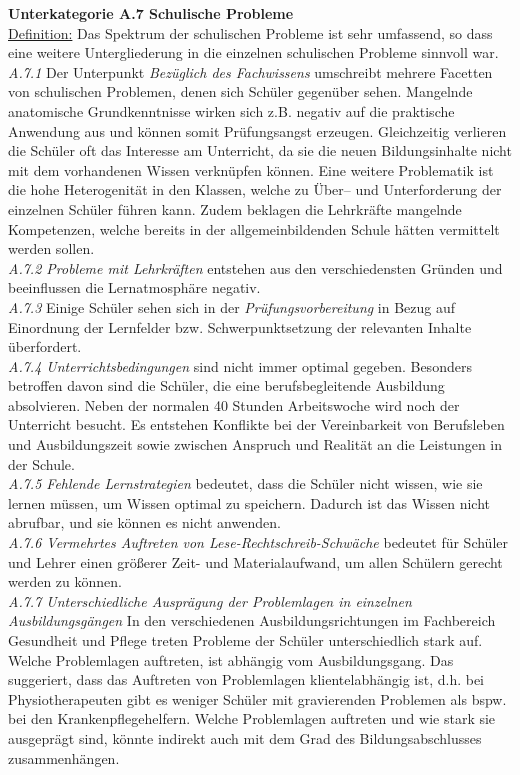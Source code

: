 \noindent
\textbf{Unterkategorie A.7 Schulische Probleme}\\
\underline{Definition:} Das Spektrum der schulischen Probleme ist sehr umfassend, so dass eine weitere Untergliederung in die einzelnen schulischen Probleme sinnvoll war.\\
\textit{A.7.1} Der Unterpunkt \textit{Bezüglich des Fachwissens} umschreibt mehrere Facetten von schulischen Problemen, denen sich Schüler gegenüber sehen. Mangelnde anatomische Grundkenntnisse wirken sich z.B. negativ auf die praktische Anwendung aus und können somit Prüfungsangst erzeugen. Gleichzeitig verlieren die Schüler oft das Interesse am Unterricht, da sie die neuen Bildungsinhalte nicht mit dem vorhandenen Wissen verknüpfen können. Eine weitere Problematik ist die hohe Heterogenität in den Klassen, welche zu Über-- und Unterforderung der einzelnen Schüler führen kann. Zudem beklagen die Lehrkräfte mangelnde Kompetenzen, welche bereits in der allgemeinbildenden Schule hätten vermittelt werden sollen.\\
\textit{A.7.2 Probleme mit Lehrkräften} entstehen aus den verschiedensten Gründen und beeinflussen die Lernatmosphäre negativ.\\
\textit{A.7.3} Einige Schüler sehen sich in der \textit{Prüfungsvorbereitung} in Bezug auf Einordnung der Lernfelder bzw. Schwerpunktsetzung der relevanten Inhalte überfordert.\\
\textit{A.7.4 Unterrichtsbedingungen} sind nicht immer optimal gegeben. Besonders betroffen davon sind die Schüler, die eine berufsbegleitende Ausbildung absolvieren. Neben der normalen 40 Stunden Arbeitswoche wird noch der Unterricht besucht. Es entstehen Konflikte bei der Vereinbarkeit von Berufsleben und Ausbildungszeit sowie zwischen Anspruch und Realität an die Leistungen in der Schule. \\
\textit{A.7.5 Fehlende Lernstrategien} bedeutet, dass die Schüler nicht wissen, wie sie lernen müssen, um Wissen optimal zu speichern. Dadurch ist das Wissen nicht abrufbar, und sie können es nicht anwenden.\\
\textit{A.7.6 Vermehrtes Auftreten von Lese-Rechtschreib-Schwäche} bedeutet für Schüler und Lehrer einen größerer Zeit- und Materialaufwand, um allen Schülern gerecht werden zu können.\\
\textit{A.7.7 Unterschiedliche Ausprägung der Problemlagen in einzelnen Ausbildungsgängen}
In den verschiedenen Ausbildungsrichtungen im Fachbereich Gesundheit und Pflege treten Probleme der Schüler unterschiedlich stark auf. Welche Problemlagen auftreten, ist abhängig vom Ausbildungsgang. Das suggeriert, dass das Auftreten von Problemlagen klientelabhängig ist, d.h. bei Physiotherapeuten gibt es weniger Schüler mit gravierenden Problemen als bspw. bei den Krankenpflegehelfern. Welche Problemlagen auftreten und wie stark sie ausgeprägt sind, könnte indirekt auch mit dem Grad des Bildungsabschlusses zusammenhängen.\\

